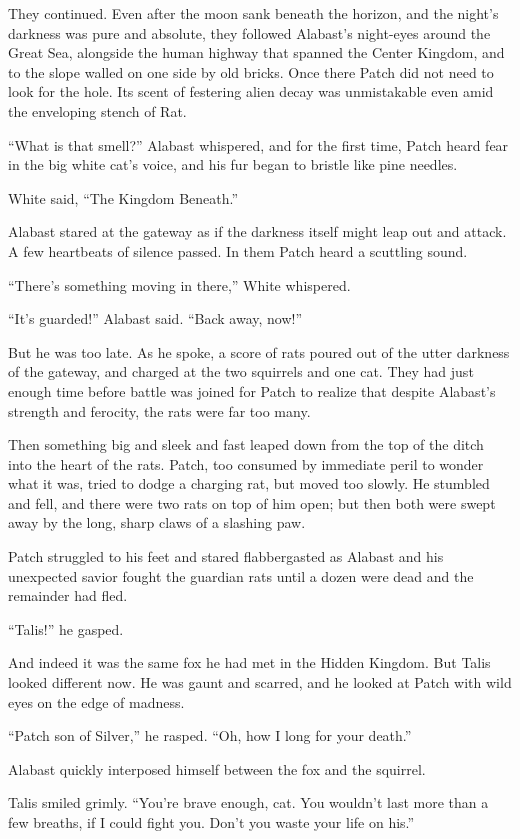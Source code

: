 \documentclass[ebook,oneside,openany,12pt]{memoir}
\begin{document}
They continued. Even after the moon sank beneath the horizon, and the
night’s darkness was pure and absolute, they followed Alabast’s
night-eyes around the Great Sea, alongside the human highway that
spanned the Center Kingdom, and to the slope walled on one side by old
bricks. Once there Patch did not need to look for the hole. Its scent
of festering alien decay was unmistakable even amid the enveloping
stench of Rat.

“What is that smell?” Alabast whispered, and for the first time, Patch
heard fear in the big white cat’s voice, and his fur began to bristle
like pine needles.

White said, “The Kingdom Beneath.”

Alabast stared at the gateway as if the darkness itself might leap out
and attack. A few heartbeats of silence passed. In them Patch heard a
scuttling sound.

“There’s something moving in there,” White whispered.

“It’s guarded!” Alabast said. “Back away, now!”

But he was too late. As he spoke, a score of rats poured out of the
utter darkness of the gateway, and charged at the two squirrels and
one cat. They had just enough time before battle was joined for Patch
to realize that despite Alabast’s strength and ferocity, the rats were
far too many.

Then something big and sleek and fast leaped down from the top of the
ditch into the heart of the rats. Patch, too consumed by immediate
peril to wonder what it was, tried to dodge a charging rat, but moved
too slowly. He stumbled and fell, and there were two rats on top of
him open; but then both were swept away by the long, sharp claws of a
slashing paw.

Patch struggled to his feet and stared flabbergasted as Alabast and
his unexpected savior fought the guardian rats until a dozen were dead
and the remainder had fled.

“Talis!” he gasped.

And indeed it was the same fox he had met in the Hidden Kingdom. But
Talis looked different now. He was gaunt and scarred, and he looked at
Patch with wild eyes on the edge of madness.

“Patch son of Silver,” he rasped. “Oh, how I long for your death.”

Alabast quickly interposed himself between the fox and the squirrel.

Talis smiled grimly. “You’re brave enough, cat. You wouldn’t last more
than a few breaths, if I could fight you. Don’t you waste your life on
his.”
\end{document}
